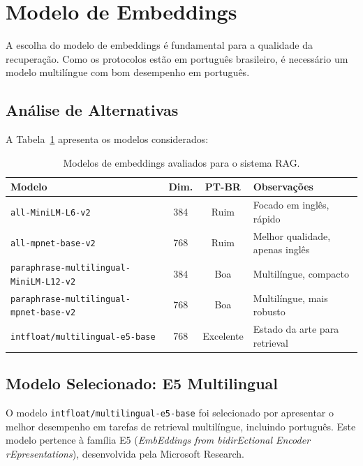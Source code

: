 \section{Modelo de Embeddings}

A escolha do modelo de embeddings é fundamental para a qualidade da recuperação. Como os protocolos estão em português brasileiro, é necessário um modelo multilíngue com bom desempenho em português.

\subsection{Análise de Alternativas}

A Tabela~\ref{tab:modelos_embedding} apresenta os modelos considerados:

\begin{table}[H]
\centering
\caption{Modelos de embeddings avaliados para o sistema RAG.}
\label{tab:modelos_embedding}
\begin{tabularx}{\textwidth}{l c c X}
\toprule
\textbf{Modelo} & \textbf{Dim.} & \textbf{PT-BR} & \textbf{Observações} \\
\midrule
\texttt{all-MiniLM-L6-v2} & 384 & Ruim & Focado em inglês, rápido \\
\texttt{all-mpnet-base-v2} & 768 & Ruim & Melhor qualidade, apenas inglês \\
\texttt{paraphrase-multilingual-MiniLM-L12-v2} & 384 & Boa & Multilíngue, compacto \\
\texttt{paraphrase-multilingual-mpnet-base-v2} & 768 & Boa & Multilíngue, mais robusto \\
\rowcolor{green!10}
\texttt{intfloat/multilingual-e5-base} & 768 & Excelente & Estado da arte para retrieval \\
\bottomrule
\end{tabularx}
\end{table}

\subsection{Modelo Selecionado: E5 Multilingual}

O modelo \texttt{intfloat/multilingual-e5-base} foi selecionado por apresentar o melhor desempenho em tarefas de retrieval multilíngue, incluindo português. Este modelo pertence à família E5 (\textit{EmbEddings from bidirEctional Encoder rEpresentations}), desenvolvida pela Microsoft Research.


